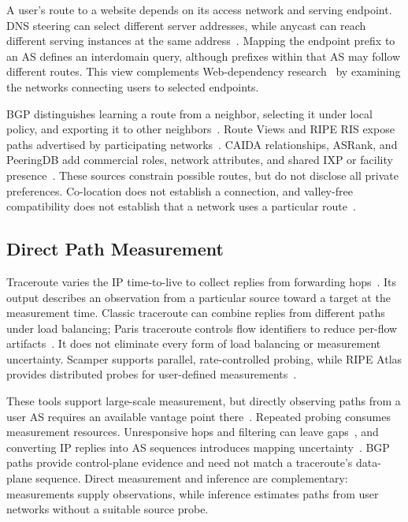 \documentclass[sigconf,anonymous,review]{acmart}
\begin{document}
A user's route to a website depends on its access network and serving
endpoint. DNS steering can select different server addresses, while anycast
can reach different serving instances at the same
address~\cite{schomp2020akamai,koch2021anycast,kumar2026steering}.
Mapping the endpoint prefix to an AS defines an interdomain query, although
prefixes within that AS may follow different routes. This view complements
Web-dependency research~\cite{kashaf2020dependencies,habib2025dependence}
by examining the networks connecting users to selected endpoints.

BGP distinguishes learning a route from a neighbor, selecting it under
local policy, and exporting it to other neighbors~\cite{rfc4271}.
Route Views and RIPE RIS expose paths advertised by participating
networks~\cite{RouteViews,RIPERIS}. CAIDA relationships, ASRank, and
PeeringDB add commercial roles, network attributes, and shared IXP or
facility presence~\cite{CAIDA,caidaASrank,PeeringDB}. These sources
constrain possible routes, but do not disclose all private preferences.
Co-location does not establish a connection, and valley-free compatibility
does not establish that a network uses a particular
route~\cite{gao2001inferring}.

\subsection{Direct Path Measurement}

Traceroute varies the IP time-to-live to collect replies from forwarding
hops~\cite{tracerouteJacobson}. Its output describes an observation from
a particular source toward a target at the measurement time. Classic
traceroute can combine replies from different paths under load balancing;
Paris traceroute controls flow identifiers to reduce per-flow
artifacts~\cite{ParisTraceroute}. It does not eliminate every form of
load balancing or measurement uncertainty. Scamper supports parallel,
rate-controlled probing, while RIPE Atlas provides distributed probes for
user-defined measurements~\cite{scamper2010,RIPEAtlas}.

These tools support large-scale measurement, but directly observing paths
from a user AS requires an available vantage point there~\cite{RIPEAtlas}.
Repeated probing consumes measurement resources. Unresponsive hops and filtering can
leave gaps~\cite{RIPEAtlasResultFormat}, and converting IP replies into AS
sequences introduces mapping uncertainty~\cite{mao2003AStraceroute}. BGP paths
provide control-plane evidence and need not match a traceroute's
data-plane sequence. Direct measurement and inference are complementary:
measurements supply observations, while inference estimates paths from
user networks without a suitable source probe.
\end{document}
